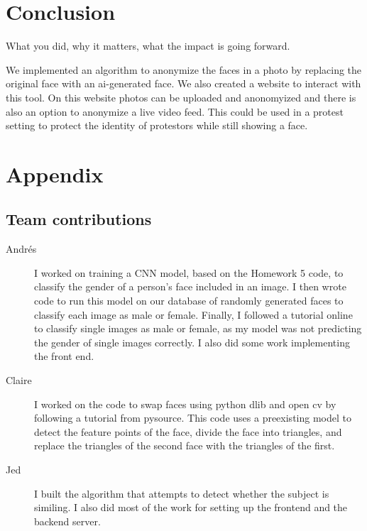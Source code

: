\section{Conclusion}

What you did, why it matters, what the impact is going forward.

We implemented an algorithm to anonymize the faces in a photo by replacing the original face with an ai-generated face.
We also created a website to interact with this tool. On this website photos can be uploaded and anonomyized and there
is also an option to anonymize a live video feed. This could be used in a protest setting to protect the identity of
protestors while still showing a face.



{\small


}

\section*{Appendix}

\subsection*{Team contributions}

\begin{description}
\item[Andrés] I worked on training a CNN model, based on the Homework 5 code, to classify the gender of a person's face included in an image. I then wrote code to run this model on our database of randomly generated faces to classify each image as male or female. Finally, I followed a tutorial online to classify single images as male or female, as my model was not predicting the gender of single images correctly. I also did some work implementing the front end.
\item[Claire] I worked on the code to swap faces using python dlib and open cv by following a tutorial from pysource. This code uses a preexisting model to detect the feature points of the face, divide the face into triangles, and replace the triangles of the second face with the triangles of the first.
\item [Jed] I built the algorithm that attempts to detect whether the subject is similing. I also did most of the work for setting up the frontend and the backend server.
\end{description}


